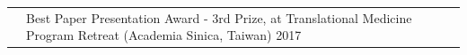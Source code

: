 \documentclass[letterpaper, 11pt]{article}
\begin{document}
\begin{longtable}{p{1.3in}p{4.8in}}


{\color{OliveGreen}{Honors and award}} 
& Best Paper Presentation Award - 3rd Prize, at Translational Medicine
Program Retreat (Academia Sinica, Taiwan) \hfill 2017\\




 



\end{longtable}
\end{document}
